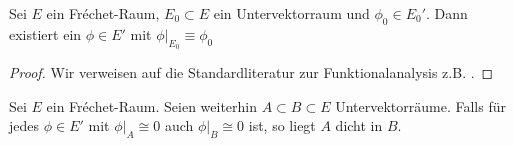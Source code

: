 \begin{thm}
  \label{thm:hahn-banach}
  Sei $E$ ein Fr\'echet-Raum, $E_0 \subset E$ ein Untervektorraum und
  $\phi_0 \in E_0'$. Dann existiert ein $\phi \in E'$ mit $\phi|_{E_0}
  \equiv \phi_0$
\end{thm}

\begin{proof}
  Wir verweisen auf die Standardliteratur zur Funktionalanalysis z.B. \cite[Satz3.6]{Rud}.
\end{proof}

\begin{cor}
  \label{cor:frechet-dicht}
  Sei $E$ ein Fr\'echet-Raum. Seien weiterhin $A \subset B \subset E$
  Untervektorräume. Falls für jedes $\phi \in E'$ mit $\phi|_A \cong
  0$ auch $\phi|_B \cong 0$ ist, so liegt $A$ dicht in $B$.
\end{cor}


